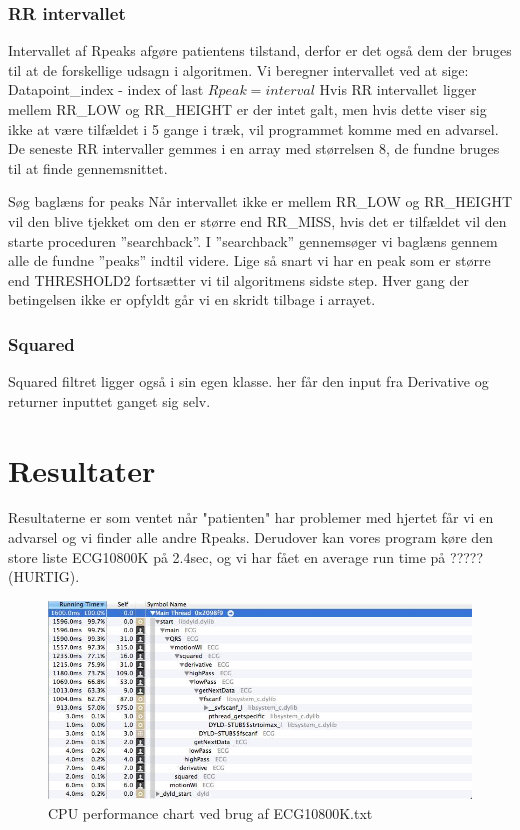 \documentclass[a4paper,12pt]{article}
\begin{document}
\subsubsection{RR intervallet}

Intervallet af Rpeaks afgøre patientens tilstand, derfor er det også dem der bruges til at de forskellige udsagn i algoritmen. Vi beregner intervallet ved at sige:
Datapoint\_index  - index of last $Rpeak = interval$
Hvis RR intervallet ligger mellem RR\_LOW og RR\_HEIGHT er der intet galt, men hvis dette viser sig ikke at være tilfældet i 5 gange i træk, vil programmet komme med en advarsel. De seneste RR intervaller gemmes i en array med størrelsen 8, de fundne bruges til at finde gennemsnittet.

Søg baglæns for peaks
Når intervallet ikke er mellem RR\_LOW og RR\_HEIGHT vil den blive tjekket om den er større end RR\_MISS, hvis det er tilfældet vil den starte proceduren ”searchback”. 
I ”searchback” gennemsøger vi baglæns gennem alle de fundne ”peaks” indtil videre.
Lige så snart vi har en peak som er større end THRESHOLD2 fortsætter vi til algoritmens sidste step. Hver gang der betingelsen ikke er opfyldt går vi en skridt tilbage i arrayet.
 

\subsubsection{Squared}
Squared filtret ligger også i sin egen klasse. her får den input fra Derivative og returner inputtet ganget sig selv.

\section{Resultater}
Resultaterne er som ventet når "patienten" har problemer med hjertet får vi en advarsel og vi finder alle andre Rpeaks. Derudover kan vores program køre den store liste ECG10800K på 2.4sec, og vi har fået en average run time på ?????(HURTIG).
\begin{figure}[htp]
\centering
\includegraphics[scale=0.6]{CPUperformance.jpg}
\caption{CPU performance chart ved brug af ECG10800K.txt}
\label{CPU performance chart ved brug af ECG10800K.txt}
\end{figure}
\end{document}
